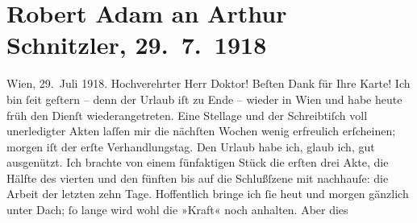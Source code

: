 

         
         \newcommand{\erwaehntePersonen}{Personen:  Molière}
         \newcommand{\erwaehnteOrte}{Orte: Andorf, Wien}
         \newcommand{\erwaehnteWerke}{Werke: Robert, Yppl. Idylle in fünf Akten}
               \section[Robert Adam an Arthur Schnitzler, 29. 7. 1918]{ Robert Adam an Arthur Schnitzler, 29. 7. 1918}\nopagebreak{}\rehead{ }\begin{ledgroupsized}[t]{13cm}\normalsize\beginnumbering \toendnotes[C]{\smallbreak\pagebreak[2]} 
\toendnotes[C]{\smallbreak}\pstart
           \raggedleft{}{\pb}Wien, 29. Juli 1918.\pend
           \pstart\center{}Hochverehrter Herr Doktor!\pend\pstart
           Beſten Dank für Ihre Karte!\pend
           \pstart
           Ich bin ſeit geſtern – denn der Urlaub iſt zu Ende – wieder in Wien und habe heute früh den Dienſt wiederangetreten. Eine
                    Stellage und der Schreibtiſch voll unerledigter Akten laſſen mir die nächſten
                    Wochen wenig erfreulich erſcheinen; morgen iſt der erſte Verhandlungstag.\pend
           \pstart
           Den Urlaub habe ich, glaub ich, gut ausgenützt. Ich brachte von einem fünfaktigen
                        Stück die erſten drei
                    Akte, die Hälfte des vierten und den fünften bis auf die Schlußſzene mit
                    nachhauſe: die Arbeit der letzten zehn Tage. Hoffentlich bringe ich ſie heut und
                    morgen gänzlich unter Dach; ſo lange wird wohl die {\pb}»Kraft« noch anhalten. Aber dies

\end{ledgroupsized}
